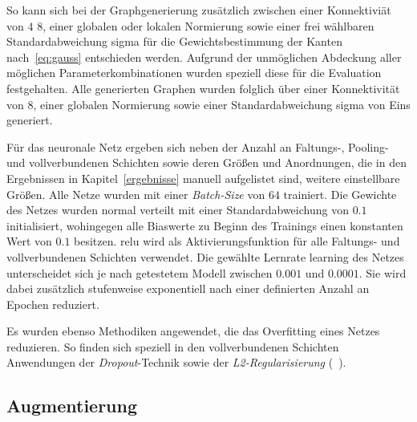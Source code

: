 So kann sich \zB{} bei der Graphgenerierung zusätzlich zwischen einer Konnektiviät von $4$ \bzw{} $8$, einer globalen oder lokalen Normierung sowie einer frei wählbaren Standardabweichung \gls{sigma} für die Gewichtsbestimmung der Kanten nach~\eqref{eq:gauss} entschieden werden.
Aufgrund der unmöglichen Abdeckung aller möglichen Parameterkombinationen wurden speziell diese für die Evaluation festgehalten.
Alle generierten Graphen wurden folglich über einer Konnektivität von $8$, einer globalen Normierung sowie einer Standardabweichung \gls{sigma} von Eins generiert.

Für das neuronale Netz ergeben sich neben der Anzahl an Faltungs-, Pooling- und vollverbundenen Schichten sowie deren Größen und Anordnungen, die in den Ergebnissen in Kapitel~\ref{ergebnisse} manuell aufgelistet sind, weitere einstellbare Größen.
Alle Netze wurden mit einer \emph{Batch-Size} von $64$ trainiert.
Die Gewichte des Netzes wurden normal verteilt mit einer Standardabweichung von $0.1$ initialisiert, wohingegen alle Biaswerte zu Beginn des Trainings einen konstanten Wert von  $0.1$ besitzen.
\gls{relu} wird als Aktivierungsfunktion für alle Faltungs- und vollverbundenen Schichten verwendet.
Die gewählte Lernrate \gls{learning} des Netzes unterscheidet sich je nach getestetem Modell zwischen $0.001$ und $0.0001$.
Sie wird dabei zusätzlich stufenweise exponentiell nach einer definierten Anzahl an Epochen reduziert.

Es wurden ebenso Methodiken angewendet, die das Overfitting eines Netzes reduzieren.
So finden sich speziell in den vollverbundenen Schichten Anwendungen der \emph{Dropout}-Technik sowie der \emph{L2-Regularisierung} (\vgl{}~\cite{dropout, weight_decay}).

\subsection{Augmentierung}
\label{augmentierung}

